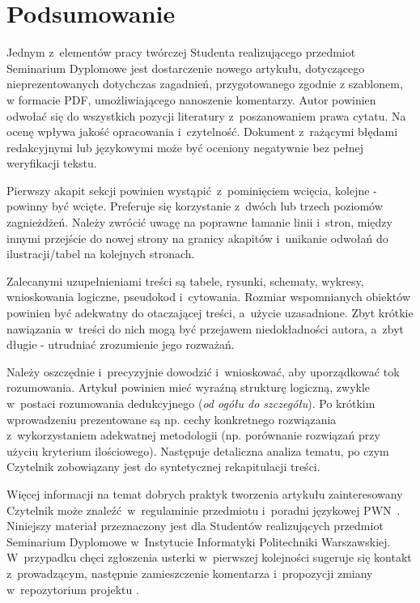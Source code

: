 \section{Podsumowanie}
\label{sec:summary}

Jednym z~elementów pracy twórczej Studenta realizującego przedmiot Seminarium Dyplomowe jest dostarczenie nowego artykułu, dotyczącego nieprezentowanych dotychczas zagadnień, przygotowanego zgodnie z szablonem, w formacie PDF, umożliwiającego nanoszenie komentarzy. Autor powinien odwołać się do wszystkich pozycji literatury z~poszanowaniem prawa cytatu. Na ocenę wpływa jakość opracowania i~czytelność. Dokument z~rażącymi błędami redakcyjnymi lub językowymi może być oceniony negatywnie bez pełnej weryfikacji tekstu.

Pierwszy akapit sekcji powinien wystąpić z~pominięciem wcięcia, kolejne - powinny być wcięte. Preferuje się korzystanie z~dwóch lub trzech poziomów zagnieżdżeń. Należy zwrócić uwagę na poprawne łamanie linii i~stron, między innymi przejście do nowej strony na granicy akapitów i~unikanie odwołań do ilustracji/tabel na kolejnych stronach.

Zalecanymi uzupełnieniami treści są tabele, rysunki, schematy, wykresy, wnioskowania logiczne, pseudokod i~cytowania. Rozmiar wspomnianych obiektów powinien być adekwatny do otaczającej treści, a~użycie uzasadnione. Zbyt krótkie nawiązania w~treści do nich mogą być przejawem niedokładności autora, a~zbyt długie - utrudniać zrozumienie jego rozważań.

Należy oszczędnie i~precyzyjnie dowodzić i~wnioskować, aby uporządkować tok rozumowania. Artykuł powinien mieć wyraźną strukturę logiczną, zwykle w~postaci rozumowania dedukcyjnego (\emph{od ogółu do szczegółu}). Po krótkim wprowadzeniu prezentowane są np. cechy konkretnego rozwiązania z~wykorzystaniem adekwatnej metodologii (np. porównanie rozwiązań przy użyciu kryterium ilościowego). Następuje detaliczna analiza tematu, po czym Czytelnik zobowiązany jest do syntetycznej rekapitulacji treści.

Więcej informacji na temat dobrych praktyk tworzenia artykułu zainteresowany Czytelnik może znaleźć w~regulaminie przedmiotu i~poradni językowej PWN~\cite{ref:pwn}. Niniejszy materiał przeznaczony jest dla Studentów realizujących przedmiot Seminarium Dyplomowe w~Instytucie Informatyki Politechniki Warszawskiej. W~przypadku chęci zgłoszenia usterki w~pierwszej kolejności sugeruje się kontakt z~prowadzącym, następnie zamieszczenie komentarza i~propozycji zmiany w~repozytorium projektu \cite{ref:github}.
